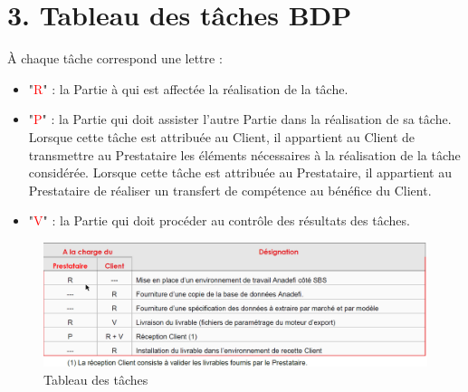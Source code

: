 \section*{3. Tableau des tâches BDP}

\Large{À chaque tâche correspond une lettre :\\ }

\begin{itemize}
\item "\textcolor{red}{R}" : la Partie à qui est affectée la réalisation de la tâche.
\item "\textcolor{red}{P}" : la Partie qui doit assister l’autre Partie dans la réalisation de sa tâche. Lorsque cette tâche est attribuée au Client, il appartient au Client de transmettre au Prestataire les éléments nécessaires à la réalisation de la tâche considérée. Lorsque cette tâche est attribuée au Prestataire, il appartient au Prestataire de réaliser un transfert de compétence au bénéfice du Client.
\item "\textcolor{red}{V}" : la Partie qui doit procéder au contrôle des résultats des tâches.\\
\end{itemize}

\begin{figure}[h]
\centering
\includegraphics[scale=0.6]{resources/tachesBDP.png}
\caption{Tableau des tâches}
\label{tbl BDP}
\end{figure}